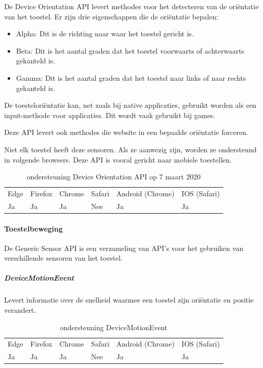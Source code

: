 De Device Orientation API \autocite{Tibbett2019} levert methodes voor het detecteren van de oriëntatie van het toestel. Er zijn drie eigenschappen die de oriëntatie bepalen:


 \begin{itemize}
	\item	Alpha:  Dit is de richting naar waar het toestel gericht is.
	\item	Beta:  Dit is het aantal graden dat het toestel voorwaarts of achterwaarts gekanteld is.
	\item   Gamma: Dit is het aantal graden dat het toestel naar links of naar rechts gekanteld is.
\end{itemize}


De toesteloriëntatie kan, net zoals bij native applicaties, gebruikt worden als een input-methode voor applicaties. Dit wordt vaak gebruikt bij games.

Deze API levert ook methodes die website in een bepaalde oriëntatie forceren.

Niet elk toestel heeft deze sensoren. Als ze aanwezig zijn, worden ze ondersteund in volgende browsers. Deze API is vooral gericht naar mobiele toestellen. 

\begin{table}[H]
	\centering
	\begin{tabular}{llllll}
		Edge & Firefox & Chrome & Safari & Android (Chrome) & IOS (Safari) \\
		Ja   & Ja      &  Ja   & Nee     & Ja               & Ja          
	\end{tabular}	
	\caption{ondersteuning Device Orientation API op 7 maart 2020}
\end{table}

\paragraph{Toestelbeweging}
De Generic Sensor API \autocite{Waldroon2019} is een verzameling van API’s voor het gebruiken van verschillende sensoren van het toestel.

	\subparagraph{DeviceMotionEvent }
	Levert informatie over de snelheid waarmee een toestel zijn oriëntatie en positie verandert.
	
	\begin{table}[H]
		\centering
		\begin{tabular}{llllll}
			Edge & Firefox & Chrome & Safari & Android (Chrome) & IOS (Safari) \\
			Ja   & Ja      &  Ja   & Nee     & Ja               & Ja          
		\end{tabular}	
		\caption{ondersteuning	DeviceMotionEvent  }
	\end{table} 
	
